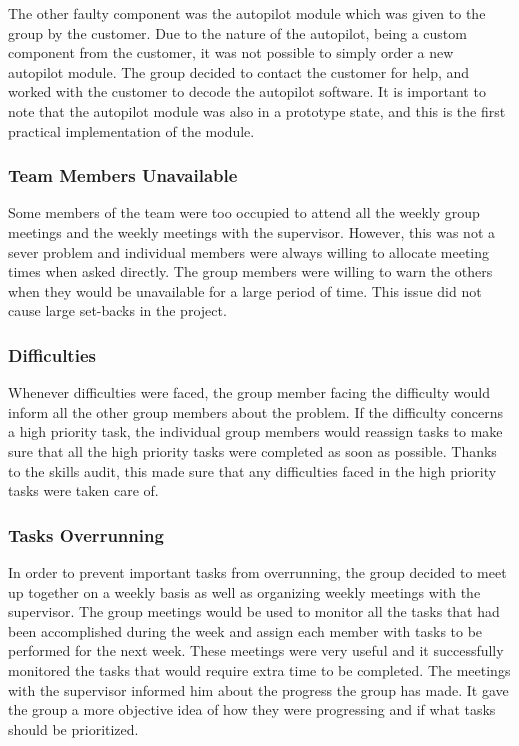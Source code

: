 The other faulty component was the autopilot module which was given to the group by the customer. 
Due to the nature of the autopilot, being a custom component from the customer, it was not possible to simply order a new autopilot module. 
The group decided to contact the customer for help, and worked with the customer to decode the autopilot software. 
It is important to note that the autopilot module was also in a prototype state, and this is the first practical implementation of the module.

\subsubsection{Team Members Unavailable}
Some members of the team were too occupied to attend all the weekly group meetings and the weekly meetings with the supervisor. 
However, this was not a sever problem and individual members were always willing to allocate meeting times when asked directly. 
The group members were willing to warn the others when they would be unavailable for a large period of time. 
This issue did not cause large set-backs in the project.

\subsubsection{Difficulties}
Whenever difficulties were faced, the group member facing the difficulty would inform all the other group members about the problem. 
If the difficulty concerns a high priority task, the individual group members would reassign tasks to make sure that all the high priority 
tasks were completed as soon as possible. Thanks to the skills audit, this made sure that 
any difficulties faced in the high priority tasks were taken care of.

\subsubsection{Tasks Overrunning}
In order to prevent important tasks from overrunning, the group decided to meet up together on a 
weekly basis as well as organizing weekly meetings with the supervisor. 
The group meetings would be used to monitor all the tasks that had been accomplished during the week and 
assign each member with tasks to be performed for the next week. 
These meetings were very useful and it successfully monitored the tasks that would require extra time to be completed. 
The meetings with the supervisor informed him about the progress the group has made. 
It gave the group a more objective idea of how they were progressing and if what tasks should be prioritized.
